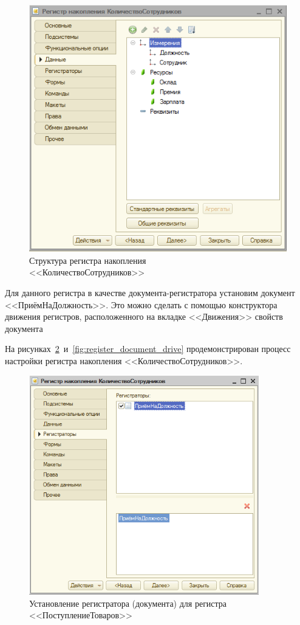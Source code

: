 \begin{figure}[h!]
  \centering
  \includegraphics[width=120mm]{pic/register}
  \caption{Структура регистра накопления \\ <<КоличествоСотрудников>>}
  \label{fig:register}
\end{figure}

Для данного регистра в качестве документа-регистратора
установим документ <<ПриёмНаДолжность>>.
Это можно сделать с помощью конструктора движения регистров,
расположенного на вкладке <<Движения>> свойств документа

\pagebreak

На рисунках~\ref{fig:register_registers}~и~\ref{fig:register_document_drive} продемонстрирован
процесс настройки регистра накопления <<КоличествоСотрудников>>.

\begin{figure}[h!]
  \centering
  \includegraphics[width=100mm]{pic/register_registers}
  \caption{Установление регистратора (документа) для регистра <<ПоступлениеТоваров>>}
  \label{fig:register_registers}
\end{figure}

